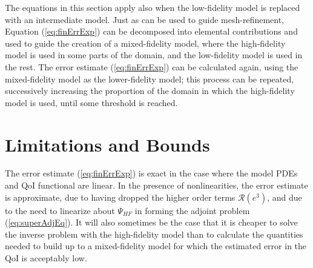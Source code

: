 The equations in this section apply also when the low-fidelity model is replaced with an intermediate model. Just as  can be used to guide mesh-refinement, Equation (\ref{eq:finErrExp}) can be decomposed into elemental contributions and used to guide the creation of a mixed-fidelity model, where the high-fidelity model is used in some parts of the domain, and the low-fidelity model is used in the rest. The error estimate (\ref{eq:finErrExp}) can be calculated again, using the mixed-fidelity model as the lower-fidelity model; this process can be repeated, successively increasing the proportion of the domain in which the high-fidelity model is used, until some threshold is reached. %


\section{Limitations and Bounds}  %

The error estimate (\ref{eq:finErrExp}) is exact in the case where the model PDEs and QoI functional are linear. In the presence of nonlinearities, the error estimate is approximate, due to having dropped the higher order terms $\mathcal{R}(e^3)$, and due to the need to linearize about $\Psi_{HF}$ in forming the adjoint problem (\ref{eq:superAdjEq}). It will also sometimes be the case that it is cheaper to solve the inverse problem with the high-fidelity model than to calculate the quantities needed to build up to a mixed-fidelity model for which the estimated error in the QoI is acceptably low. %

